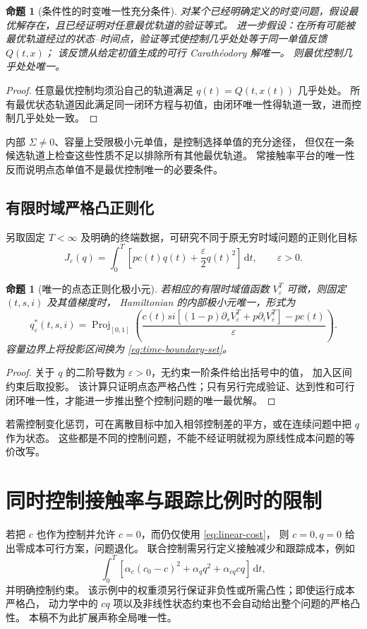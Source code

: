 \documentclass[11pt,a4paper,UTF8]{ctexart}
\newtheorem{proposition}[theorem]{命题}
\theoremstyle{definition}
\newcommand{\dd}{\,\mathrm d}
\newcommand{\proj}{\operatorname{Proj}}
\begin{document}
\begin{proposition}[条件性的时变唯一性充分条件]
\label{prop:time-conditional}
对某个已经明确定义的时变问题，假设最优解存在，且已经证明对任意最优轨道的验证等式。
进一步假设：在所有可能被最优轨道经过的状态--时间点，验证等式使控制几乎处处等于同一单值反馈 $Q(t,x)$；
该反馈从给定初值生成的可行 Carath\'eodory 解唯一。
则最优控制几乎处处唯一。
\end{proposition}
\begin{proof}
任意最优控制均须沿自己的轨道满足 $q(t)=Q(t,x(t))$ 几乎处处。
所有最优状态轨道因此满足同一闭环方程与初值，由闭环唯一性得轨道一致，进而控制几乎处处一致。
\end{proof}
内部 $\Sigma\ne0$、容量上受限极小元单值，是控制选择单值的充分途径，
但仅在一条候选轨道上检查这些性质不足以排除所有其他最优轨道。
常接触率平台的唯一性反而说明点态单值不是最优控制唯一的必要条件。

\subsection{有限时域严格凸正则化}
另取固定 $T<\infty$ 及明确的终端数据，可研究不同于原无穷时域问题的正则化目标
\begin{equation}
J_\varepsilon(q)=\int_0^T\left[pc(t)q(t)+\frac\varepsilon2q(t)^2\right]\dd t,
\qquad\varepsilon>0.
\label{eq:regularized-cost}
\end{equation}
\begin{proposition}[唯一的点态正则化极小元]
\label{prop:regularized-pointwise}
若相应的有限时域值函数 $V_\varepsilon^T$ 可微，则固定 $(t,s,i)$ 及其值梯度时，
Hamiltonian 的内部极小元唯一，形式为
\begin{equation}
q_\varepsilon^*(t,s,i)=\proj_{[0,1]}
\left(\frac{c(t)si[(1-p)\partial_sV_\varepsilon^T+p\partial_iV_\varepsilon^T]-pc(t)}\varepsilon\right).
\label{eq:projection-feedback}
\end{equation}
容量边界上将投影区间换为 \eqref{eq:time-boundary-set}。
\end{proposition}
\begin{proof}
关于 $q$ 的二阶导数为 $\varepsilon>0$，无约束一阶条件给出括号中的值，
加入区间约束后取投影。
该计算只证明点态严格凸性；只有另行完成验证、达到性和可行闭环唯一性，才能进一步推出整个控制问题的唯一最优解。
\end{proof}
若需控制变化惩罚，可在离散目标中加入相邻控制差的平方，或在连续问题中把 $q$ 作为状态。
这些都是不同的控制问题，不能不经证明就视为原线性成本问题的等价改写。

\section{同时控制接触率与跟踪比例时的限制}
若把 $c$ 也作为控制并允许 $c=0$，而仍仅使用 \eqref{eq:linear-cost}，
则 $c=0,q=0$ 给出零成本可行方案，问题退化。
联合控制需另行定义接触减少和跟踪成本，例如
\begin{equation}
\int_0^T[\alpha_c(c_0-c)^2+\alpha_q q^2+\alpha_{cq}cq]\dd t,
\label{eq:joint-cost}
\end{equation}
并明确控制约束。
该示例中的权重须另行保证非负性或所需凸性；即使运行成本严格凸，
动力学中的 $cq$ 项以及非线性状态约束也不会自动给出整个问题的严格凸性。
本稿不为此扩展声称全局唯一性。
\end{document}
